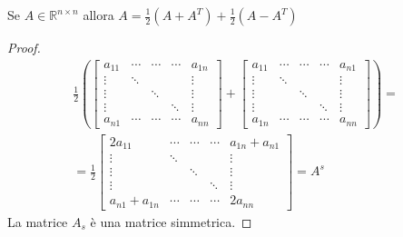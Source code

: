 \begin{exercise}[3.13]
Se $A \in \mathbb{R}^{n \times n}$ allora $A = \frac{1}{2}(A + A^{T}) +
\frac{1}{2}(A - A^{T})$
\end{exercise}
\begin{proof}
\begin{displaymath}
\begin{split}
\frac{1}{2}
\left (
\begin{bmatrix}
a_{11} & \cdots & \cdots &\cdots & a_{1n} \\
\vdots & \ddots &		&		& \vdots\\
\vdots &  		& \ddots & 		& \vdots\\
\vdots & 		&		& \ddots & \vdots\\
a_{n1} & \cdots & \cdots &\cdots & a_{nn}
\end{bmatrix} + 
\begin{bmatrix}
a_{11} & \cdots & \cdots &\cdots & a_{n1} \\
\vdots & \ddots &		&		& \vdots\\
\vdots &  		& \ddots & 		& \vdots\\
\vdots & 		&		& \ddots & \vdots\\
a_{1n} & \cdots & \cdots &\cdots & a_{nn}
\end{bmatrix} \right ) = \\
= \frac{1}{2} 
\begin{bmatrix}
2a_{11} & \cdots & \cdots &\cdots & a_{1n} + a_{n1} \\
\vdots & \ddots &		&		& \vdots\\
\vdots &  		& \ddots & 		& \vdots\\
\vdots & 		&		& \ddots & \vdots\\
a_{n1} + a_{1n} & \cdots & \cdots &\cdots & 2a_{nn}
\end{bmatrix} = A^{s}
\end{split}
\end{displaymath}
La matrice $A_{s}$ \`e una matrice simmetrica.


\end{proof}

